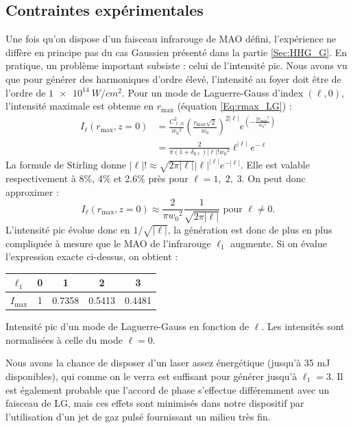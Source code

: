 \subsection{Contraintes expérimentales}
\label{sec:contraintes}
Une fois qu'on dispose d'un faisceau infrarouge de MAO défini, l'expérience ne diffère en principe pas du cas Gaussien présenté dans la partie \ref{Sec:HHG_G}. En pratique, un problème important subsiste : celui de l'intensité pic. Nous avons vu que pour générer des harmoniques d'ordre élevé, l'intensité au foyer doit être de l'ordre de $\SI{1e14}{W/cm^2}$. Pour un mode de Laguerre-Gauss d'index $(\ell,0)$, l'intensité maximale est obtenue en $r_\mathrm{max}$ (équation \ref{Eq:rmax_LG}) :
\begin{align*}
I_\ell(r_\mathrm{max},z=0) &= \frac{C_{\ell,0}^2}{{w_0}^2}{\left( {\frac{r_\mathrm{max}\sqrt{2}}{{w_0}}} \right)^{2\left| \ell  \right|}}{e^{\left( { - \frac{{2{{r_\mathrm{max}}^2}}}{{{{w_0}^2}}}} \right)}}\\
&= \frac{2}{\pi(1+\delta_{0\ell})\left| \ell  \right|!{w_0}^2}\ell^{\left| \ell  \right|}{e^{-\ell}}
\end{align*}
La formule de Stirling donne $\left| \ell  \right|!\approx\sqrt{2\pi\left| \ell  \right|}\left| \ell  \right|^{\left| \ell  \right|}e^{-\left| \ell  \right|}$. Elle est valable respectivement à 8\%, 4\% et 2.6\% près pour $\ell=1,\;2,\;3$. On peut donc approximer :
\begin{equation*}
I_\ell(r_\mathrm{max},z=0) \approx \frac{2}{\pi{w_0}^2}\frac{1}{\sqrt{2\pi\left| \ell  \right|}}\text{ pour }\ell\neq0. 
\end{equation*}  
L'intensité pic évolue donc en $1/\sqrt{\left| \ell  \right|}$, la génération est donc de plus en plus compliquée à mesure que le MAO de l'infrarouge $\ell_{1}$ augmente. Si on évalue l'expression exacte ci-dessus, on obtient :

\begin{center}
  \begin{tabular}{ c | c | c | c | c }
    \hline
		$\ell_{1}$ & 0 & 1 & 2 & 3 \\ \hline
    $I_{\mathrm{max}}$ & 1 & 0.7358 & 0.5413 & 0.4481 \\ \hline
  \end{tabular}
	\caption{Intensité pic d'un mode de Laguerre-Gauss en fonction de $\ell$. Les intensités sont normalisées à celle du mode $\ell = 0$.}
	\label{tab:ipeaklg}
\end{center}
Nous avons la chance de disposer d'un laser assez énergétique (jusqu'à 35 mJ disponibles), qui comme on le verra est suffisant pour générer jusqu'à $\ell_{1}=3$. Il est également probable que l'accord de phase s'effectue différemment avec un faisceau de LG, mais ces effets sont minimisés dans notre dispositif par l'utilisation d'un jet de gaz pulsé fournissant un milieu très fin.

